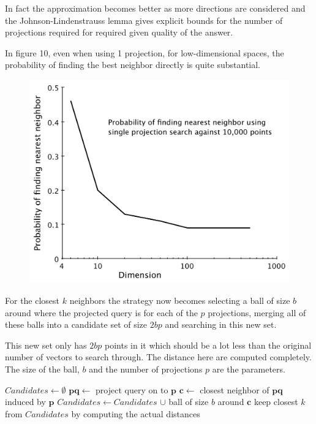 \documentclass{article}
\begin{document}
In fact the approximation becomes better as more directions are considered and the
Johnson-Lindenstrauss lemma gives explicit bounds for the number of projections
required for required given quality of the answer.

In figure 10, even when using 1 projection, for low-dimensional spaces, the
probability of finding the best neighbor directly is quite substantial.

\begin{figure}[H]
    \caption{}
    \includegraphics[scale=0.7]{qualproj.png}
\end{figure}

For the closest $k$ neighbors the strategy now becomes selecting a ball of size $b$ around where
the projected query is for each of the $p$ projections, merging all of these
balls into a candidate set of size $2bp$ and searching in this new set.

This new set only has $2bp$ points in it which should be a lot less than the
original number of vectors to search through. The distance here are computed
completely.
The size of the ball, $b$ and the number of projections $p$ are the parameters.

\begin{algorithmic}[1]
    \State $Candidates \gets \emptyset$
        \State $\mathbf{pq}\gets$ project query on to $\mathbf{p}$
        \State $\mathbf{c}\gets$ closest neighbor of $\mathbf{pq}$ induced by $\mathbf{p}$
        \State $Candidates\gets Candidates$ $\cup$ ball of size $b$ around $\mathbf{c}$
    \EndFor
    \State keep closest $k$ from $Candidates$ by computing the actual distances
\end{algorithmic}
\end{document}
